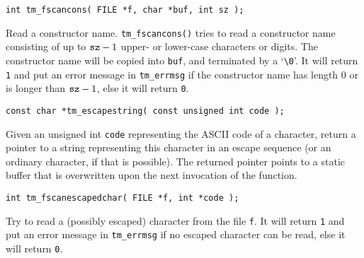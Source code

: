 \begin{verbatim}
int tm_fscancons( FILE *f, char *buf, int sz );
\end{verbatim}
\begin{desc}
Read a constructor name.
\verb+tm_fscancons()+ tries to read a constructor name consisting of up to
${\tt sz}-1$ upper- or lower-case characters or digits.
The constructor name will be copied into {\tt buf},
and terminated by a `\verb+\0+'.
It will return {\tt 1} and put an error message in {\tt tm\_errmsg}
if the constructor name has length 0 or is longer than ${\tt sz}-1$,
else it will return {\tt 0}.
\end{desc}
\begin{verbatim}
const char *tm_escapestring( const unsigned int code );
\end{verbatim}
\begin{desc}
Given an unsigned int \verb+code+ representing the ASCII code of a character,
return a pointer to a string representing this character in an
escape sequence (or an ordinary character, if that is possible).
The returned pointer points to a static buffer that is overwritten
upon the next invocation of the function.
\end{desc}
\begin{verbatim}
int tm_fscanescapedchar( FILE *f, int *code );
\end{verbatim}
\begin{desc}
Try to read a (possibly escaped) character from the file \verb'f'. 
It will return {\tt 1} and put an error message in {\tt tm\_errmsg}
if no escaped character can be read,
else it will return {\tt 0}.
\end{desc}

